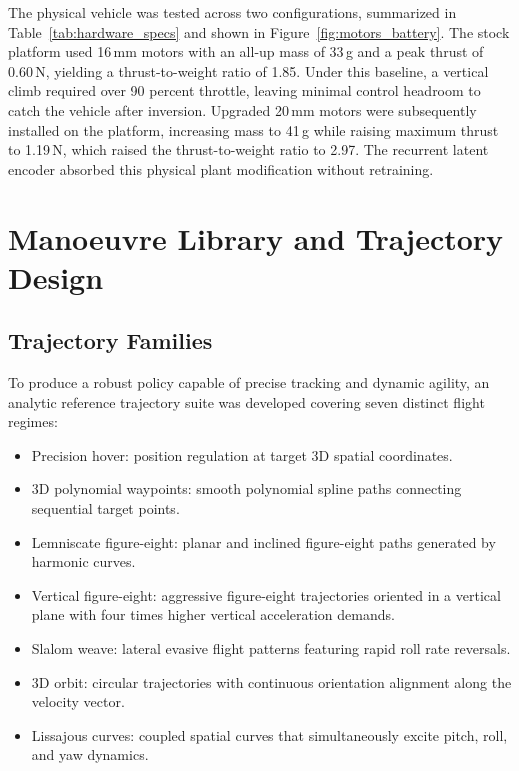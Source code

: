 \documentclass[11pt,a4paper]{article}
\begin{document}
The physical vehicle was tested across two configurations, summarized in Table~\ref{tab:hardware_specs} and shown in Figure~\ref{fig:motors_battery}. The stock platform used 16\,mm motors with an all-up mass of 33\,g and a peak thrust of 0.60\,N, yielding a thrust-to-weight ratio of 1.85. Under this baseline, a vertical climb required over 90 percent throttle, leaving minimal control headroom to catch the vehicle after inversion. Upgraded 20\,mm motors were subsequently installed on the platform, increasing mass to 41\,g while raising maximum thrust to 1.19\,N, which raised the thrust-to-weight ratio to 2.97. The recurrent latent encoder absorbed this physical plant modification without retraining.

\section{Manoeuvre Library and Trajectory Design}
\label{sec:trajectories}

\subsection{Trajectory Families}
To produce a robust policy capable of precise tracking and dynamic agility, an analytic reference trajectory suite was developed covering seven distinct flight regimes:
\begin{itemize}[leftmargin=*,itemsep=2pt]
  \item Precision hover: position regulation at target 3D spatial coordinates.
  \item 3D polynomial waypoints: smooth polynomial spline paths connecting sequential target points.
  \item Lemniscate figure-eight: planar and inclined figure-eight paths generated by harmonic curves.
  \item Vertical figure-eight: aggressive figure-eight trajectories oriented in a vertical plane with four times higher vertical acceleration demands.
  \item Slalom weave: lateral evasive flight patterns featuring rapid roll rate reversals.
  \item 3D orbit: circular trajectories with continuous orientation alignment along the velocity vector.
  \item Lissajous curves: coupled spatial curves that simultaneously excite pitch, roll, and yaw dynamics.
\end{itemize}
\end{document}
